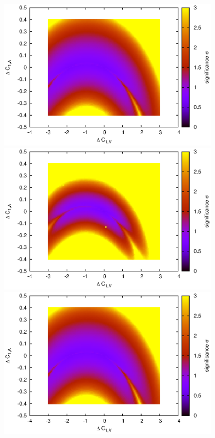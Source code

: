 \documentclass[preprint]{JHEP3} %
\begin{document}
\begin{figure}[t]
\\
\includegraphics[scale=0.6]{BLLLO1223HSsig_SUA2_300_1.30.eps} 
\includegraphics[scale=0.6]{BLLNLO1223sig_SUA2_300_1.15.eps} 
\\
\includegraphics[scale=0.6]{BLLLO1223HSsig_SUA2_300_1.30.eps} 

\end{figure}
\end{document}
